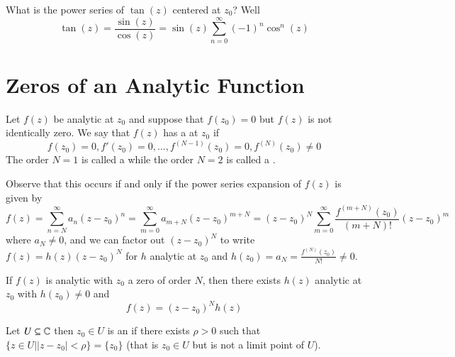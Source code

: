 \begin{example}
    What is the power series of $\tan(z)$ centered at $z_0$? Well \begin{equation*}
        \tan(z) = \frac{\sin(z)}{\cos(z)} = \sin(z)\sum_{n=0}^{\infty}(-1)^n\cos^n(z)
    \end{equation*}
\end{example}



\section{Zeros of an Analytic Function}


\begin{definition}
    Let $f(z)$ be analytic at $z_0$ and suppose that $f(z_0) = 0$ but $f(z)$ is not identically zero. We say that $f(z)$ has a  at $z_0$ if \begin{equation*}
        f(z_0) = 0, f'(z_0) = 0,...,f^{(N-1)}(z_0) = 0, f^{(N)}(z_0) \neq 0
    \end{equation*}
    The order $N = 1$ is called a  while the order $N =2$ is called a .
\end{definition}

Observe that this occurs if and only if the power series expansion of $f(z)$ is given by \begin{equation*}
    f(z) = \sum_{n=N}^{\infty}a_n(z-z_0)^n = \sum_{m=0}^{\infty}a_{m+N}(z-z_0)^{m+N} = (z-z_0)^N\sum_{m=0}^{\infty}\frac{f^{(m+N)}(z_0)}{(m+N)!}(z-z_0)^m
\end{equation*}
where $a_N \neq 0$, and we can factor out $(z-z_0)^N$ to write $f(z) = h(z)(z-z_0)^N$ for $h$ analytic at $z_0$ and $h(z_0) = a_N = \frac{f^{(N)}(z_0)}{N!} \neq 0$.

\begin{theorem}
    If $f(z)$ is analytic with $z_0$ a zero of order $N$, then there exists $h(z)$ analytic at $z_0$ with $h(z_0) \neq 0$ and \begin{equation*}
        f(z) = (z-z_0)^Nh(z)
    \end{equation*}
\end{theorem}


\begin{definition}
    Let $U \subseteq \mathbb C$ then $z_0 \in U$ is an  if there exists $\rho > 0$ such that $\{z \in U\vert |z-z_0| < \rho\} = \{z_0\}$ (that is $z_0 \in U$ but is not a limit point of $U$).
\end{definition}



